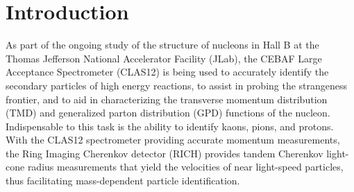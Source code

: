 \section{Introduction}
As part of the ongoing study of the structure of nucleons \cite{Avakian:2010ae}  in Hall B at the Thomas Jefferson National Accelerator Facility (JLab), the CEBAF Large Acceptance Spectrometer (CLAS12) \cite{Burkert:2020akg} is being used to accurately identify the secondary particles of high energy reactions, to assist in probing the strangeness frontier, and to aid in characterizing the transverse momentum distribution (TMD) and generalized parton distribution (GPD) functions of the nucleon. Indispensable to this task is the ability to identify kaons, pions, and protons.  With the CLAS12 spectrometer providing accurate momentum measurements, the Ring Imaging Cherenkov detector (RICH) \cite{Contalbrigo:2020,Contalbrigo:2020snw,Mirazita:2017vav,Contalbrigo:2014rqa} provides tandem Cherenkov light-cone radius measurements that yield the velocities of near light-speed particles, thus facilitating mass-dependent particle identification.


